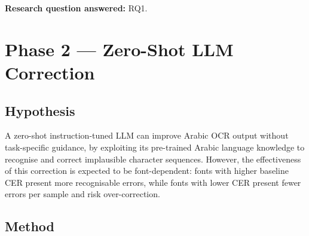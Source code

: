\noindent
\textbf{Research question answered:} RQ1.

\section{Phase 2 --- Zero-Shot LLM Correction}
\label{sec:phase2}

\subsection{Hypothesis}
A zero-shot instruction-tuned LLM can improve Arabic OCR output without
task-specific guidance, by exploiting its pre-trained Arabic language knowledge
to recognise and correct implausible character sequences. However, the
effectiveness of this correction is expected to be font-dependent: fonts with
higher baseline CER present more recognisable errors, while fonts with lower
CER present fewer errors per sample and risk over-correction.

\subsection{Method}
\label{subsec:phase2_method}


